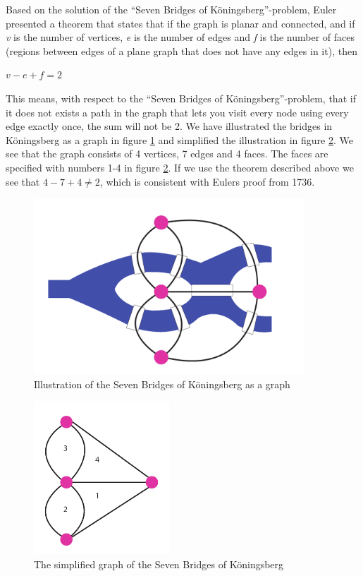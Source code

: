 Based on the solution of the ``Seven Bridges of Köningsberg''-problem, Euler presented a theorem that states that if the graph is planar and connected, and if \textit{v} is the number of vertices, \textit{e} is the number of edges and \textit{f} is the number of faces (regions between edges of a plane graph that does not have any edges in it), then 
\newline
\newline
\centerline{$v-e+f=2$}
\newline
\newline
This means, with respect to the ``Seven Bridges of Köningsberg''-problem, that if it does not exists a path in the graph that lets you visit every node using every edge exactly once, the sum will not be 2. We have illustrated the bridges in Köningsberg as a graph in figure \ref{fig:7bridgesIllustration} and simplified the illustration in figure \ref{fig:7bridgesSimplification}. We see that the graph consists of 4 vertices, 7 edges and 4 faces. The faces are specified with numbers 1-4 in figure \ref{fig:7bridgesSimplification}. If we use the theorem described above we see that $4-7+4\neq2$, which is consistent with Eulers proof from 1736. 

\begin{figure}[H]
  \centering
  \includegraphics[width=4in]{assets/7bridges.pdf}
  \caption{Illustration of the Seven Bridges of Köningsberg as a graph} 
  \label{fig:7bridgesIllustration}
\end{figure}

\begin{figure}[H]
  \centering
  \includegraphics[width=2in]{assets/7bridges2.pdf}
  \caption{The simplified graph of the Seven Bridges of Köningsberg} 
  \label{fig:7bridgesSimplification}
\end{figure}

